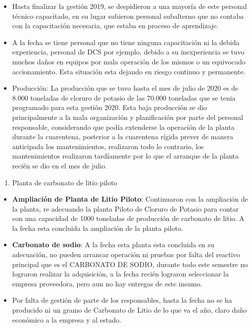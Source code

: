 \documentclass[a4paper, nobind]{templates/ociamthesis}
\providecommand{\tightlist}{%
  \setlength{\itemsep}{0pt}\setlength{\parskip}{0pt}}
\begin{document}
\begin{itemize}
\item
  Hasta finalizar la gestión 2019, se despidieron a una mayoría de este personal técnico capacitado, en su lugar subieron personal subalterno que no contaba con la capacitación necesaria, que estaba en proceso de aprendizaje.
\item
  A la fecha se tiene personal que no tiene ninguna capacitación ni la debida experiencia, personal de DCS por ejemplo, debido a su inexperiencia se tuvo muchos daños en equipos por mala operación de los mismos o un equivocado accionamiento. Esta situación esta dejando en riesgo continuo y permanente.
\item
  Producción: La producción que se tuvo hasta el mes de julio de 2020 es de 8.000 toneladas de cloruro de potasio de las 70.000 toneladas que se tenia programado para esta gestión 2020. Esta baja producción se dio principalmente a la mala organización y planificación por parte del personal responsable, considerando que podía extenderse la operación de la planta durante la cuarentena, posterior a la cuarentena rígida prever de manera anticipada los mantenimientos, realizaron todo lo contrario, los mantenimientos realizaron tardíamente por lo que el arranque de la planta recién se dio en el mes de julio.
\end{itemize}

\begin{enumerate}
\def\labelenumi{\arabic{enumi}.}
\setcounter{enumi}{7}
\tightlist
\item
  Planta de carbonato de litio piloto
\end{enumerate}

\begin{itemize}
\item
  \textbf{Ampliación de Planta de Litio Piloto}: Continuaron con la ampliación de la planta, re adecuando la planta Piloto de Cloruro de Potasio para contar con una capacidad de 1000 toneladas de producción de carbonato de litio. A la fecha esta concluida la ampliación de la planta piloto.
\item
  \textbf{Carbonato de sodio}: A la fecha esta planta esta concluida en su adecuación, no pueden arrancar operación ni pruebas por falta del reactivo principal que es el CARBONATO DE SODIO, durante todo este semestre no lograron realizar la adquisición, a la fecha recién lograron seleccionar la empresa proveedora, pero aun no hay entregas de este insumo.
\item
  Por falta de gestión de parte de los responsables, hasta la fecha no se ha producido ni un gramo de Carbonato de Litio de lo que va el año, claro daño económico a la empresa y al estado.
\end{itemize}
\end{document}

